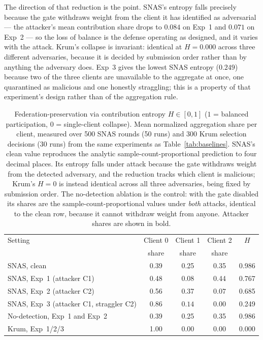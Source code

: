 \documentclass[pdflatex,sn-mathphys-num]{sn-jnl}
\begin{document}
The direction of that reduction is the point. SNAS's entropy falls precisely because the gate withdraws weight from the client it has identified as adversarial --- the attacker's mean contribution share drops to $0.084$ on Exp~1 and $0.071$ on Exp~2 --- so the loss of balance is the defense operating as designed, and it varies with the attack. Krum's collapse is invariant: identical at $H=0.000$ across three different adversaries, because it is decided by submission order rather than by anything the adversary does. Exp~3 gives the lowest SNAS entropy ($0.249$) because two of the three clients are unavailable to the aggregate at once, one quarantined as malicious and one honestly straggling; this is a property of that experiment's design rather than of the aggregation rule.

\begin{table}[htbp]
\caption{Federation-preservation via contribution entropy $H\in[0,1]$ ($1$ = balanced participation, $0$ = single-client collapse). Mean normalized aggregation share per client, measured over 500 SNAS rounds (50 runs) and 300 Krum selection decisions (30 runs) from the same experiments as Table~\ref{tab:baselines}. SNAS's clean value reproduces the analytic sample-count-proportional prediction to four decimal places. Its entropy falls under attack because the gate withdraws weight from the detected adversary, and the reduction tracks which client is malicious; Krum's $H=0$ is instead identical across all three adversaries, being fixed by submission order. The no-detection ablation is the control: with the gate disabled its shares are the sample-count-proportional values under \emph{both} attacks, identical to the clean row, because it cannot withdraw weight from anyone. Attacker shares are shown in bold.}
\label{tab:entropy}
\centering
\begin{tabular}{lcccc}
\toprule
Setting & Client 0 & Client 1 & Client 2 & $H$ \\
 & share & share & share & \\
\midrule
SNAS, clean                & 0.39 & 0.25 & 0.35 & 0.986 \\
SNAS, Exp~1 (attacker C1)  & 0.48 & $\mathbf{0.08}$ & 0.44 & 0.767 \\
SNAS, Exp~2 (attacker C2)  & 0.56 & 0.37 & $\mathbf{0.07}$ & 0.685 \\
SNAS, Exp~3 (attacker C1, straggler C2) & 0.86 & $\mathbf{0.14}$ & 0.00 & 0.249 \\
\midrule
No-detection, Exp~1 and Exp~2 & 0.39 & 0.25 & 0.35 & 0.986 \\
Krum, Exp~1/2/3            & 1.00 & 0.00 & 0.00 & 0.000 \\
\bottomrule
\end{tabular}
\end{table}
\end{document}
